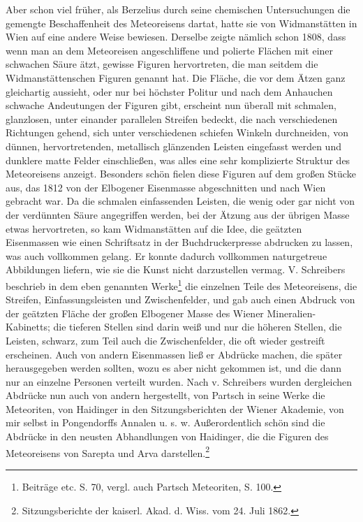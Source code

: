 \documentclass[a4paper, 11pt, oneside]{article}
\begin{document}
Aber schon viel früher, als Berzelius durch seine chemischen Untersuchungen die gemengte Beschaffenheit des Meteoreisens dartat, hatte sie von Widmanstätten in Wien auf eine andere Weise bewiesen. Derselbe zeigte nämlich schon 1808, dass wenn man an dem Meteoreisen angeschliffene und polierte Flächen mit einer schwachen Säure ätzt, gewisse Figuren hervortreten, die man seitdem die Widmanstättenschen Figuren genannt hat. Die Fläche, die vor dem Ätzen ganz gleichartig aussieht, oder nur bei höchster Politur und nach dem Anhauchen schwache Andeutungen der Figuren gibt, erscheint nun überall mit schmalen, glanzlosen, unter einander parallelen Streifen bedeckt, die nach verschiedenen Richtungen gehend, sich unter verschiedenen schiefen Winkeln durchneiden, von dünnen, hervortretenden, metallisch glänzenden Leisten eingefasst werden und dunklere matte Felder einschließen, was alles eine sehr komplizierte Struktur des Meteoreisens anzeigt. Besonders schön fielen diese Figuren auf dem großen Stücke aus, das 1812 von der Elbogener Eisenmasse abgeschnitten und nach Wien gebracht war. Da die schmalen einfassenden Leisten, die wenig oder gar nicht von der verdünnten Säure angegriffen werden, bei der Ätzung aus der übrigen Masse etwas hervortreten, so kam Widmanstätten auf die Idee, die geätzten Eisenmassen wie einen Schriftsatz in der Buchdruckerpresse abdrucken zu lassen, was auch vollkommen gelang. Er konnte dadurch vollkommen naturgetreue Abbildungen liefern, wie sie die Kunst nicht darzustellen vermag. V. Schreibers beschrieb in dem eben genannten Werke\footnote{Beiträge etc. S. 70, vergl. auch Partsch Meteoriten, S. 100.} die einzelnen Teile des Meteoreisens, die Streifen, Einfassungsleisten und Zwischenfelder, und gab auch einen Abdruck von der geätzten Fläche der großen Elbogener Masse des Wiener Mineralien-Kabinetts; die tieferen Stellen sind darin weiß und nur die höheren Stellen, die Leisten, schwarz, zum Teil auch die Zwischenfelder, die oft wieder gestreift erscheinen. Auch von andern Eisenmassen ließ er Abdrücke machen, die später herausgegeben werden sollten, wozu es aber nicht gekommen ist, und die dann nur an einzelne Personen verteilt wurden. Nach v. Schreibers wurden dergleichen Abdrücke nun auch von andern hergestellt, von Partsch in seine Werke die Meteoriten, von Haidinger in den Sitzungsberichten der Wiener Akademie, von mir selbst in Pongendorffs Annalen u. s. w. Außerordentlich schön sind die Abdrücke in den neusten Abhandlungen von Haidinger, die die Figuren des Meteoreisens von Sarepta und Arva darstellen.\footnote{Sitzungsberichte der kaiserl. Akad. d. Wiss. vom 24. Juli 1862.}
\end{document}
